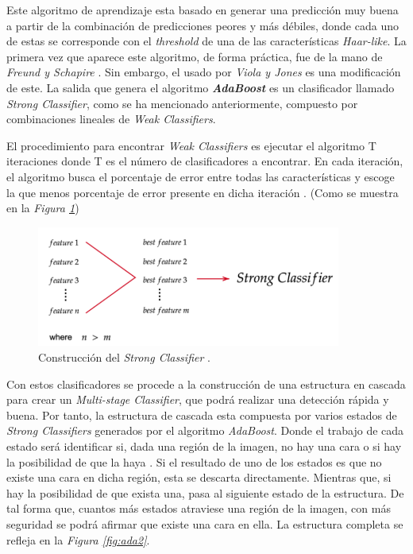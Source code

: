 Este algoritmo de aprendizaje esta basado en generar una predicción muy buena a partir de la combinación de predicciones peores y más débiles, donde cada uno de estas se corresponde con el \textit{threshold} de una de las características \textit{Haar-like}. La primera vez que aparece este algoritmo, de forma práctica, fue de la mano de \textit{Freund y Schapire} \cite{adaboost1}. Sin embargo, el usado por \textit{Viola y Jones} es una modificación de este. La salida que genera el algoritmo \textbf{\textit{AdaBoost}} es un clasificador llamado \textit{Strong Classifier}, como se ha mencionado anteriormente, compuesto por combinaciones lineales de \textit{Weak Classifiers}. 

El procedimiento para encontrar \textit{Weak Classifiers} es ejecutar el algoritmo T iteraciones donde T es el número de clasificadores a encontrar. En cada iteración, el algoritmo busca el porcentaje de error entre todas las características y escoge la que menos porcentaje de error presente en dicha iteración \cite{adaboost2}. (Como se muestra en la \textit{Figura \ref{fig:ada1}}) 

\begin{figure}[htp]
	\centering
	\includegraphics[width=10cm]{imagenes/ada1.png}
	\caption{Construcción del \textit{Strong Classifier} \cite{adaboost2}.}
	\label{fig:ada1}
\end{figure}

Con estos clasificadores se procede a la construcción de una estructura en cascada para crear un \textit{Multi-stage Classifier}, que podrá realizar una detección rápida y buena. Por tanto, la estructura de cascada esta compuesta por varios estados de \textit{Strong Classifiers} generados por el algoritmo \textit{AdaBoost}. Donde el trabajo de cada estado será identificar si, dada una región de la imagen, no hay una cara o si hay la posibilidad de que la haya \cite{adaboost1}. Si el resultado de uno de los estados es que no existe una cara en dicha región, esta se descarta directamente. Mientras que, si hay la posibilidad de que exista una, pasa al siguiente estado de la estructura. De tal forma que, cuantos más estados atraviese una región de la imagen, con más seguridad se podrá afirmar que existe una cara en ella. La estructura completa se refleja en la \textit{Figura \ref{fig:ada2}}.

